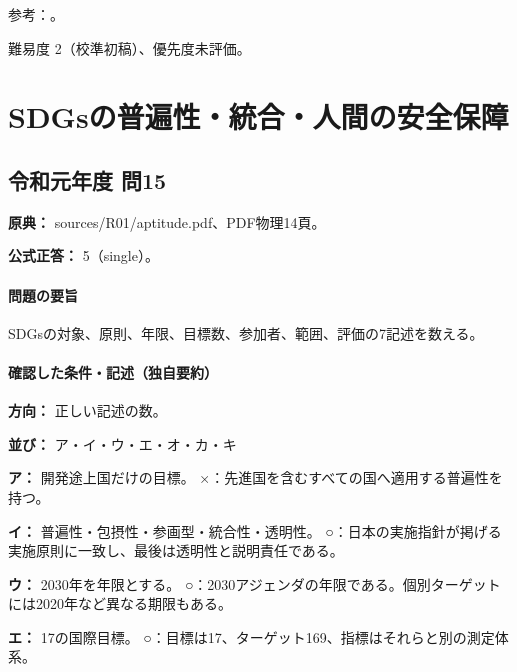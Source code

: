 \par 参考：\cite{env_renewable2022,env_hydrogen2015,env_biomass,env_paris}。

\par 難易度 2（校準初稿）、優先度未評価。

\section{SDGsの普遍性・統合・人間の安全保障}

\subsection{令和元年度 問15}
\label{q:r01-reg-apt-15}

\noindent\textbf{原典：} sources/R01/aptitude.pdf、PDF物理14頁。

\textbf{公式正答：} 5（single）。

\paragraph{問題の要旨} SDGsの対象、原則、年限、目標数、参加者、範囲、評価の7記述を数える。

\paragraph{確認した条件・記述（独自要約）}\mbox{}\par

\noindent\textbf{方向：} 正しい記述の数。\par

\noindent\textbf{並び：} ア・イ・ウ・エ・オ・カ・キ\par

\noindent\textbf{ア：} 開発途上国だけの目標。 ×：先進国を含むすべての国へ適用する普遍性を持つ。\par

\noindent\textbf{イ：} 普遍性・包摂性・参画型・統合性・透明性。 ○：日本の実施指針が掲げる実施原則に一致し、最後は透明性と説明責任である。\par

\noindent\textbf{ウ：} 2030年を年限とする。 ○：2030アジェンダの年限である。個別ターゲットには2020年など異なる期限もある。\par

\noindent\textbf{エ：} 17の国際目標。 ○：目標は17、ターゲット169、指標はそれらと別の測定体系。\par

